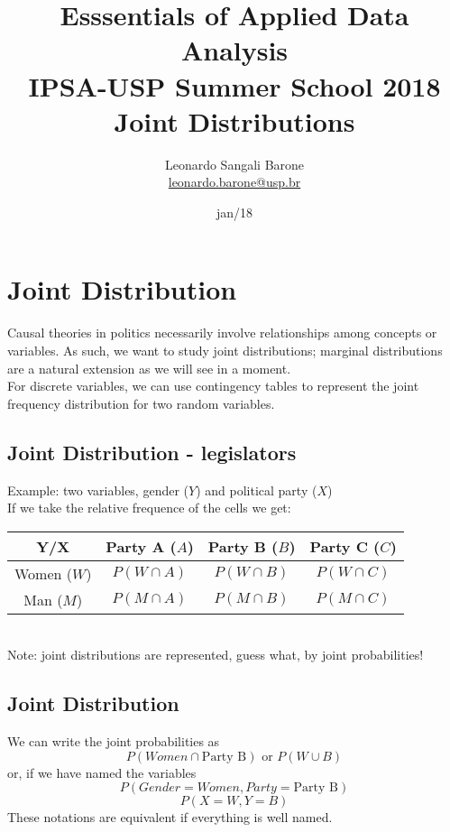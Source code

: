 \documentclass[11pt]{article}
\title{\textbf{Esssentials of Applied Data Analysis\\
				IPSA-USP Summer School 2018}\newline\\
				Joint Distributions}
\author{Leonardo Sangali Barone\\ 	\href{leonardo.barone@usp.br}{leonardo.barone@usp.br}}
\date{jan/18}
\begin{document}
\maketitle


\section*{Joint Distribution}

	Causal theories in politics necessarily involve relationships among concepts or variables. As such, we want to study joint distributions; marginal distributions are a natural extension as we will see in a moment.
	\newline\\
	For discrete variables, we can use contingency tables to represent the joint frequency distribution for two random variables.


	\subsection*{Joint Distribution - legislators}
	
	Example: two variables, gender ($Y$) and political party ($X$)\\
	If we take the relative frequence of the cells we get:\\

	\begin{tabular}{|c|ccc|}
\hline
	Y/X & Party A ($A$) & Party B ($B$) & Party C ($C$)\\
\hline
	Women ($W$) & $P(W \cap A)$ & $P(W \cap B)$ & $P(W \cap C)$\\
	Man ($M$) & $P(M \cap A)$ & $P(M \cap B)$ & $P(M \cap C)$\\
\hline
\end{tabular}\newline\\
Note: joint distributions are represented, guess what, by joint probabilities!


	\subsection*{Joint Distribution }
	We can write the joint probabilities as \[P(Women \cap \text{Party B}) \text{ or }P(W \cup B)\] or, if we have named the variables \[P(Gender = Women, Party = \text{Party B})\] \[P(X = W, Y = B)\] These notations are equivalent if everything is well named.
\end{document}
